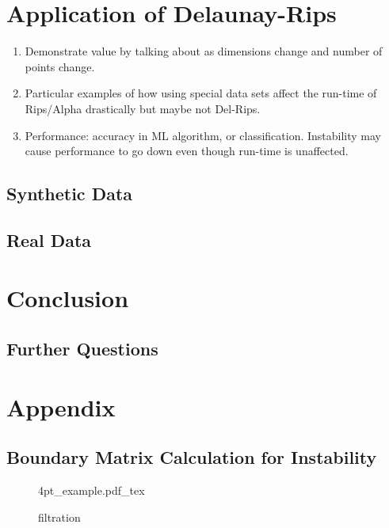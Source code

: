 \documentclass[letterpaper,titlepage]{article}
\newcommand{\incfig}[1]{%
    \def\svgwidth{\columnwidth}
    {4pt_example.pdf_tex}
}
\begin{document}
\section{Application of Delaunay-Rips}
\begin{enumerate}
    \item Demonstrate value by talking about as dimensions change and number of points change.
    \item Particular examples of how using special data sets affect the run-time of Rips/Alpha drastically but maybe not Del-Rips.
    \item Performance: accuracy in ML algorithm, or classification. Instability may cause performance to go down even though run-time is unaffected.
\end{enumerate}

\subsection{Synthetic Data}

\subsection{Real Data}



\section{Conclusion}



\subsection{Further Questions}

\section{Appendix}

\subsection{Boundary Matrix Calculation for Instability}\label{boundary_mat}

\begin{figure}[ht]
    \centering
    \incfig{Filtration}
    \caption{filtration}
    \label{fig:4pt_example}
\end{figure}
\end{document}
